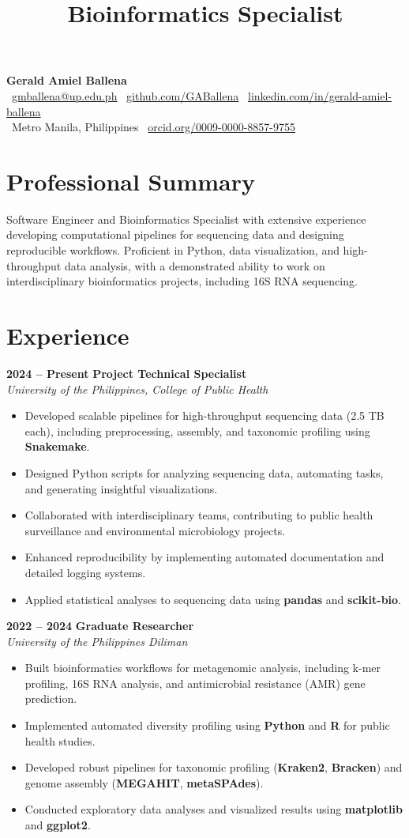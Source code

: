 \documentclass[11pt,a4paper,sans]{moderncv}
\title{Bioinformatics Specialist}
\makeatletter
\renewcommand{\makecvtitle}{
	\vspace*{-2em}
	\begin{center}
		{\Huge \textbf{Gerald Amiel Ballena}} \\[0.5em]
		\faEnvelope \ \href{mailto:gmballena@up.edu.ph}{gmballena@up.edu.ph} \quad
		\faGithub \ \href{https://github.com/GABallena}{github.com/GABallena} \quad
		\faLinkedin \ \href{https://linkedin.com/in/gerald-amiel-ballena}{linkedin.com/in/gerald-amiel-ballena} \\[0.5em]
		\faMapMarker \ Metro Manila, Philippines \quad
		\aiOrcid \ \href{https://orcid.org/0009-0000-8857-9755}{orcid.org/0009-0000-8857-9755}
	\end{center}
	\vspace{1.5em}
}
\makeatother
\begin{document}
	
	\makecvtitle
	
	\section{Professional Summary}
	Software Engineer and Bioinformatics Specialist with extensive experience developing computational pipelines for sequencing data and designing reproducible workflows. Proficient in Python, data visualization, and high-throughput data analysis, with a demonstrated ability to work on interdisciplinary bioinformatics projects, including 16S RNA sequencing.
	
	\section{Experience}
	\textbf{2024 – Present} \hfill \textbf{Project Technical Specialist} \\
	\textit{University of the Philippines, College of Public Health} \\[-1em]
	\begin{itemize}
		\item Developed scalable pipelines for high-throughput sequencing data (2.5 TB each), including preprocessing, assembly, and taxonomic profiling using \textbf{Snakemake}.
		\item Designed Python scripts for analyzing sequencing data, automating tasks, and generating insightful visualizations.
		\item Collaborated with interdisciplinary teams, contributing to public health surveillance and environmental microbiology projects.
		\item Enhanced reproducibility by implementing automated documentation and detailed logging systems.
		\item Applied statistical analyses to sequencing data using \textbf{pandas} and \textbf{scikit-bio}.
	\end{itemize}
	
	\textbf{2022 – 2024} \hfill \textbf{Graduate Researcher} \\
	\textit{University of the Philippines Diliman} \\[-1em]
	\begin{itemize}
		\item Built bioinformatics workflows for metagenomic analysis, including k-mer profiling, 16S RNA analysis, and antimicrobial resistance (AMR) gene prediction.
		\item Implemented automated diversity profiling using \textbf{Python} and \textbf{R} for public health studies.
		\item Developed robust pipelines for taxonomic profiling (\textbf{Kraken2}, \textbf{Bracken}) and genome assembly (\textbf{MEGAHIT}, \textbf{metaSPAdes}).
		\item Conducted exploratory data analyses and visualized results using \textbf{matplotlib} and \textbf{ggplot2}.
	\end{itemize}
	
\end{document}
